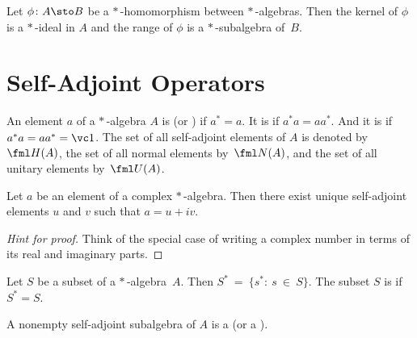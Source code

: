 \begin{prop}\label{0010952} Let $\phi\colon A \sto B$ be a $*\,$-homomorphism between $*\,$-algebras. Then
the kernel of $\phi$ is a $*\,$-ideal in $A$ and the range of $\phi$ is a
$*\,$-subalgebra of~$B$.
\end{prop}
















\section{Self-Adjoint Operators}
\begin{defn} An element $a$ of a $*\,$-algebra $A$ is
 (or
) if $a^* = a$.  It is
 if $a^*a = aa^*$. And it is
 if $a^*a = aa^* = \vc 1$. The set of all self-adjoint elements of $A$ is
denoted by
$\fml H(A)$, the set of all normal elements
by~$\fml N(A)$, and the set of all unitary elements
by~$\fml U(A)$.
\end{defn}

\begin{prop}\label{001093} Let $a$ be an element of a complex $*\,$-algebra.  Then there exist
unique self-adjoint elements $u$ and $v$ such that $a = u + iv$.
\end{prop}

\begin{proof}[\emph{Hint for proof}] Think of the special case of writing a complex
number in terms of its real and imaginary parts.  \ns
\end{proof}

\begin{defn} Let $S$ be a subset of a $*\,$-algebra~$A$.  Then
$S^*~=~\{s^*\colon~s~\in~S\}$. The subset $S$ is
 if $S^* = S$.

A nonempty self-adjoint subalgebra of $A$ is a
 (or a ).
\end{defn}

